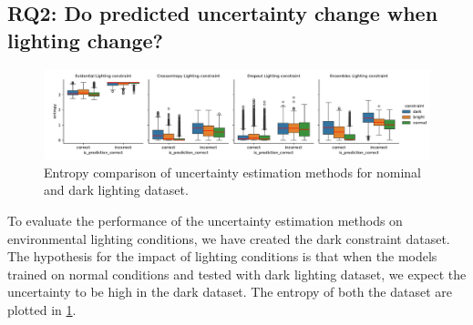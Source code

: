 
\subsection{RQ2: Do predicted uncertainty change when lighting change?}

\begin{figure}[b]
	\centering
	\includegraphics[width=\textwidth]{images/lighting_boxplot.pdf}
	\caption{Entropy comparison of uncertainty estimation methods for nominal and dark lighting dataset.}
	\label{fig:entropy_dark}
\end{figure}


To evaluate the performance of the uncertainty estimation methods on environmental lighting conditions, we have created the dark constraint dataset. The hypothesis for the impact of lighting conditions is that when the models trained on normal conditions and tested with dark lighting dataset,  we expect the uncertainty to be high in the dark dataset. The entropy of both the dataset are plotted in \cref{fig:entropy_dark}. 


